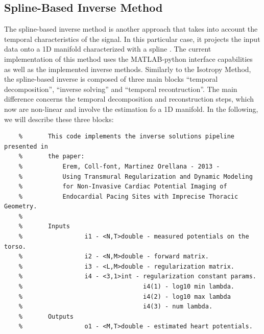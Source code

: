 \subsection{Spline-Based Inverse Method}

    The spline-based inverse method is another approach that takes into account the temporal characteristics of the signal. In this particular case, it projects the input data onto a 1D manifold characterized with a spline \cite{}.
    The current implementation of this method uses the MATLAB-python interface capabilities as well as the implemented inverse methods.
    Similarly to the Isotropy Method, the spline-based inverse is composed of three main blocks ``temporal decomposition'', ``inverse solving'' and ``temporal recontruction''.
    The main difference concerns the temporal decomposition and reconstruction steps, which now are non-linear and involve the estimation fo a 1D manifold.
    In the following, we will describe these three blocks:


    \begin{verbatim}
    %		This code implements the inverse solutions pipeline presented in
    %		the paper:
    %	        Erem, Coll-font, Martinez Orellana - 2013 -
    %	        Using Transmural Regularization and Dynamic Modeling
    %	        for Non-Invasive Cardiac Potential Imaging of
    %	        Endocardial Pacing Sites with Imprecise Thoracic Geometry.
    %
    %		Inputs
    %				  i1 - <N,T>double - measured potentials on the torso.
    %				  i2 - <N,M>double - forward matrix.
    %				  i3 - <L,M>double - regularization matrix.
    %				  i4 - <3,1>int - regularization constant params.
    %				                  i4(1) - log10 min lambda.
    %				                  i4(2) - log10 max lambda
    %				                  i4(3) - num lambda.
    %		Outputs
    %				  o1 - <M,T>double - estimated heart potentials.
    \end{verbatim}


    \begin{verbatim}

    \end{verbatim}

